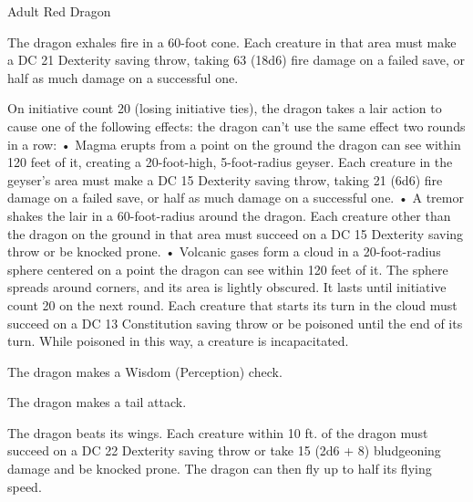 \begin{monsterbox}{Adult Red Dragon}
\begin{monsteraction}
The dragon exhales fire in a 60-foot cone. Each creature in that area must make a DC 21 Dexterity saving throw, taking 63 (18d6) fire damage on a failed save, or half as much damage on a successful one.
\end{monsteraction}
\begin{monsteraction}
On initiative count 20 (losing initiative ties), the dragon takes a lair action to cause one of the following effects: the dragon can't use the same effect two rounds in a row:
• Magma erupts from a point on the ground the dragon can see within 120 feet of it, creating a 20-foot-high, 5-foot-radius geyser. Each creature in the geyser's area must make a DC 15 Dexterity saving throw, taking 21 (6d6) fire damage on a failed save, or half as much damage on a successful one.
• A tremor shakes the lair in a 60-foot-radius around the dragon. Each creature other than the dragon on the ground in that area must succeed on a DC 15 Dexterity saving throw or be knocked prone.
• Volcanic gases form a cloud in a 20-foot-radius sphere centered on a point the dragon can see within 120 feet of it. The sphere spreads around corners, and its area is lightly obscured. It lasts until initiative count 20 on the next round. Each creature that starts its turn in the cloud must succeed on a DC 13 Constitution saving throw or be poisoned until the end of its turn. While poisoned in this way, a creature is incapacitated.
\end{monsteraction}
\begin{monsteraction}[Detect]
The dragon makes a Wisdom (Perception) check.
\end{monsteraction}
\begin{monsteraction}
The dragon makes a tail attack.
\end{monsteraction}
\begin{monsteraction}
The dragon beats its wings. Each creature within 10 ft. of the dragon must succeed on a DC 22 Dexterity saving throw or take 15 (2d6 + 8) bludgeoning damage and be knocked prone. The dragon can then fly up to half its flying speed.
\end{monsteraction}
\end{monsterbox}
